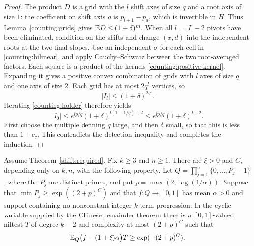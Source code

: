 \begin{proof}
The product $D$ is a grid with the $l$ shift axes of size $q$ and a
root axis of size $1$: the coefficient on shift axis $a$ is
$p_{l+1}-p_a$, which is invertible in $H$.  Thus
Lemma~\ref{counting:grids} gives $\mathbb E D\leq(1+\delta)^m$.
When all $l=|I|-2$ pivots have been eliminated,
condition on the shifts and change $(x,d)$ into the independent roots at
the two final slopes.  Use an independent $\sigma$ for each cell in
\eqref{counting:bilinear}, and apply Cauchy--Schwarz between the two
root-averaged factors.  Each square is a product of the kernels
\eqref{counting:positive-kernel}.  Expanding it gives a positive convex
combination of grids with $l$ axes of size $q$ and one axis of size $2$.
Each grid has at most $2q^l$ vertices, so
\[
 |I_l|\leq(1+\delta)^{2q^l}.
\]
Iterating \eqref{counting:holder} therefore yields
\[
 |I_0|\leq
 e^{lp/q}(1+\delta)^{l(1-1/q)+2}
 \leq e^{lp/q}(1+\delta)^{l+2}.
\]
First choose the multiple defining $q$ large, and then $\delta$ small,
so that this is less than $1+c_\tau$.  This contradicts the detection
inequality and completes the induction.
\end{proof}

\begin{proposition}
\label{counting:absolute}
Assume Theorem~\ref{shift:required}.  Fix $k\geq3$ and $n\geq1$.  There are
$\xi>0$ and $C$, depending only on $k,n$, with the following property.
Let $Q=\prod_{j=1}^n\{0,\ldots,P_j-1\}$, where the $P_j$ are distinct
primes, and put $p=\max(2,\log(1/\alpha))$.  Suppose that
$\min P_j\geq\exp((2+p)^C)$ and that $f:Q\to[0,1]$ has mean
$\alpha>0$ and support containing no nonconstant integer $k$-term
progression.  In the cyclic variable supplied by the Chinese remainder
theorem there is a $[0,1]$-valued niltest $T$ of degree $k-2$ and
complexity at most $(2+p)^C$ such that
\begin{equation}\label{counting:absolute-score}
 \mathbb E_Q\bigl(f-(1+\xi)\alpha\bigr)T
 \geq\exp(-(2+p)^C).
\end{equation}
\end{proposition}

